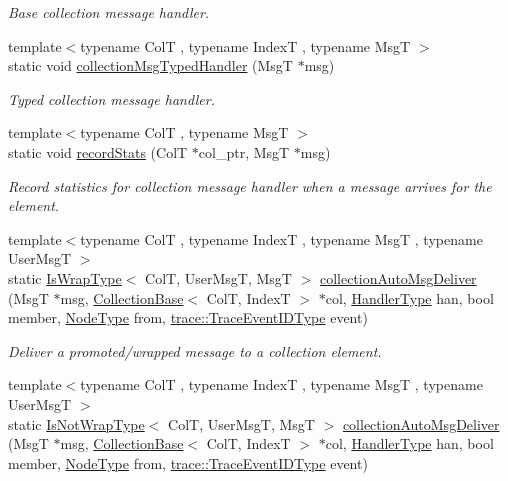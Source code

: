 \begin{DoxyCompactItemize}
\begin{DoxyCompactList}\small\item\em Base collection message handler. \end{DoxyCompactList}\item 
{\footnotesize template$<$typename ColT , typename IndexT , typename MsgT $>$ }\\static void \hyperlink{structvt_1_1vrt_1_1collection_1_1_collection_manager_a7bb443544c8c4b94a7a10a0ec8126018}{collection\+Msg\+Typed\+Handler} (MsgT $\ast$msg)
\begin{DoxyCompactList}\small\item\em Typed collection message handler. \end{DoxyCompactList}\item 
{\footnotesize template$<$typename ColT , typename MsgT $>$ }\\static void \hyperlink{structvt_1_1vrt_1_1collection_1_1_collection_manager_a3d49cc2ae24c50443e890e9447d408a9}{record\+Stats} (ColT $\ast$col\+\_\+ptr, MsgT $\ast$msg)
\begin{DoxyCompactList}\small\item\em Record statistics for collection message handler when a message arrives for the element. \end{DoxyCompactList}\item 
{\footnotesize template$<$typename ColT , typename IndexT , typename MsgT , typename User\+MsgT $>$ }\\static \hyperlink{structvt_1_1vrt_1_1collection_1_1_collection_manager_a1f91c97ed52237c3a3576dfbbe87c8f8}{Is\+Wrap\+Type}$<$ ColT, User\+MsgT, MsgT $>$ \hyperlink{structvt_1_1vrt_1_1collection_1_1_collection_manager_a4816815fd287f57cab4db958985c193c}{collection\+Auto\+Msg\+Deliver} (MsgT $\ast$msg, \hyperlink{structvt_1_1vrt_1_1collection_1_1_collection_base}{Collection\+Base}$<$ ColT, IndexT $>$ $\ast$col, \hyperlink{namespacevt_af64846b57dfcaf104da3ef6967917573}{Handler\+Type} han, bool member, \hyperlink{namespacevt_a866da9d0efc19c0a1ce79e9e492f47e2}{Node\+Type} from, \hyperlink{namespacevt_1_1trace_a64a7185f3e102df8d8258f263ccd1582}{trace\+::\+Trace\+Event\+I\+D\+Type} event)
\begin{DoxyCompactList}\small\item\em Deliver a promoted/wrapped message to a collection element. \end{DoxyCompactList}\item 
{\footnotesize template$<$typename ColT , typename IndexT , typename MsgT , typename User\+MsgT $>$ }\\static \hyperlink{structvt_1_1vrt_1_1collection_1_1_collection_manager_a18e3a17d9eb086c6c2f499242b7faa1e}{Is\+Not\+Wrap\+Type}$<$ ColT, User\+MsgT, MsgT $>$ \hyperlink{structvt_1_1vrt_1_1collection_1_1_collection_manager_a14b3a40fcde230a6113d032b8175d15d}{collection\+Auto\+Msg\+Deliver} (MsgT $\ast$msg, \hyperlink{structvt_1_1vrt_1_1collection_1_1_collection_base}{Collection\+Base}$<$ ColT, IndexT $>$ $\ast$col, \hyperlink{namespacevt_af64846b57dfcaf104da3ef6967917573}{Handler\+Type} han, bool member, \hyperlink{namespacevt_a866da9d0efc19c0a1ce79e9e492f47e2}{Node\+Type} from, \hyperlink{namespacevt_1_1trace_a64a7185f3e102df8d8258f263ccd1582}{trace\+::\+Trace\+Event\+I\+D\+Type} event)

\end{DoxyCompactItemize}
